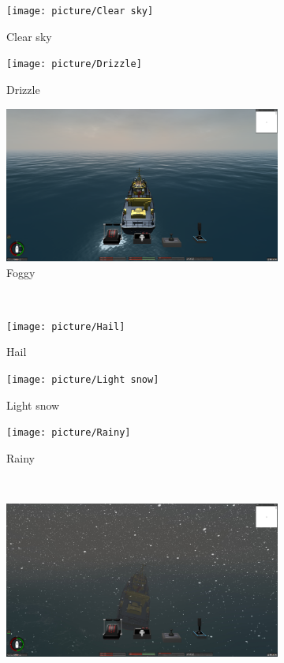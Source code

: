 \documentclass[letterpaper,10pt]{article}
\begin{document}
\begin{figure}[htbp]
			\begin{subfigure}{0.3\textwidth}
				\texttt{[image: picture/Clear sky]}
				\captionsetup{font=scriptsize}
				\caption{Clear sky}
				\label{fig: Clear sky}
			\end{subfigure}
			\begin{subfigure}{0.3\textwidth}
				\texttt{[image: picture/Drizzle]}
				\captionsetup{font=scriptsize}
				\caption{Drizzle}
				\label{fig: Drizzle}
			\end{subfigure}
			\begin{subfigure}{0.3\textwidth}
				\includegraphics[width=\linewidth]{picture/Foggy}
				\captionsetup{font=scriptsize}
				\caption{Foggy}
				\label{fig: Foggy}	
			\end{subfigure}\\
			\begin{subfigure}{0.3\textwidth}
				\texttt{[image: picture/Hail]}
				\captionsetup{font=scriptsize}
				\caption{Hail}
				\label{fig: Hail}	
			\end{subfigure}
			\begin{subfigure}{0.3\textwidth}
				\texttt{[image: picture/Light snow]}
				\captionsetup{font=scriptsize}
				\caption{Light snow}
				\label{fig: Light snow}
			\end{subfigure}
			\begin{subfigure}{0.3\textwidth}
				\texttt{[image: picture/Rainy]}
				\captionsetup{font=scriptsize}
				\caption{Rainy}
				\label{fig: Rainy}
			\end{subfigure}\\
			\begin{subfigure}{0.3\textwidth}
				\includegraphics[width=\linewidth]{picture/Snow storm}

\end{subfigure}
\end{figure}
\end{document}
